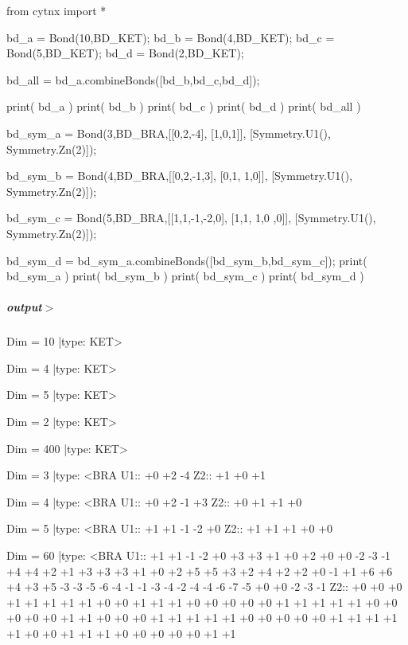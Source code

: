 \begin{DoxyCodeInclude}
\textcolor{keyword}{from} cytnx \textcolor{keyword}{import} *

bd\_a = Bond(10,BD\_KET);
bd\_b = Bond(4,BD\_KET);
bd\_c = Bond(5,BD\_KET);
bd\_d = Bond(2,BD\_KET);

bd\_all = bd\_a.combineBonds([bd\_b,bd\_c,bd\_d]);
    
print( bd\_a )
print( bd\_b )
print( bd\_c )   
print( bd\_d )
print( bd\_all )


bd\_sym\_a = Bond(3,BD\_BRA,[[0,2,-4],
                          [1,0,1]],
                          [Symmetry.U1(),
                           Symmetry.Zn(2)]);
                            
bd\_sym\_b = Bond(4,BD\_BRA,[[0,2,-1,3],
                          [0,1, 1,0]],
                          [Symmetry.U1(),
                           Symmetry.Zn(2)]);

bd\_sym\_c = Bond(5,BD\_BRA,[[1,1,-1,-2,0],
                          [1,1, 1,0 ,0]],
                          [Symmetry.U1(),
                           Symmetry.Zn(2)]);

bd\_sym\_d = bd\_sym\_a.combineBonds([bd\_sym\_b,bd\_sym\_c]);
print( bd\_sym\_a )
print( bd\_sym\_b )
print( bd\_sym\_c )
print( bd\_sym\_d )

\end{DoxyCodeInclude}
 \subparagraph*{output$>$}


\begin{DoxyVerbInclude}
Dim = 10 |type: KET>     

Dim = 4 |type: KET>     

Dim = 5 |type: KET>     

Dim = 2 |type: KET>     

Dim = 400 |type: KET>     

Dim = 3 |type: <BRA     
 U1::  +0 +2 -4
 Z2::  +1 +0 +1

Dim = 4 |type: <BRA     
 U1::  +0 +2 -1 +3
 Z2::  +0 +1 +1 +0

Dim = 5 |type: <BRA     
 U1::  +1 +1 -1 -2 +0
 Z2::  +1 +1 +1 +0 +0

Dim = 60 |type: <BRA     
 U1::  +1 +1 -1 -2 +0 +3 +3 +1 +0 +2 +0 +0 -2 -3 -1 +4 +4 +2 +1 +3 +3 +3 +1 +0 +2 +5 +5 +3 +2 +4 +2 +2 +0 -1 +1 +6 +6 +4 +3 +5 -3 -3 -5 -6 -4 -1 -1 -3 -4 -2 -4 -4 -6 -7 -5 +0 +0 -2 -3 -1
 Z2::  +0 +0 +0 +1 +1 +1 +1 +1 +0 +0 +1 +1 +1 +0 +0 +0 +0 +0 +1 +1 +1 +1 +1 +0 +0 +0 +0 +0 +1 +1 +0 +0 +0 +1 +1 +1 +1 +1 +0 +0 +0 +0 +0 +1 +1 +1 +1 +1 +0 +0 +1 +1 +1 +0 +0 +0 +0 +0 +1 +1










\end{DoxyVerbInclude}
 \mbox{\label{classcytnx_1_1Bond_a1fd655bfe0845839502b6e385d743078}} 
